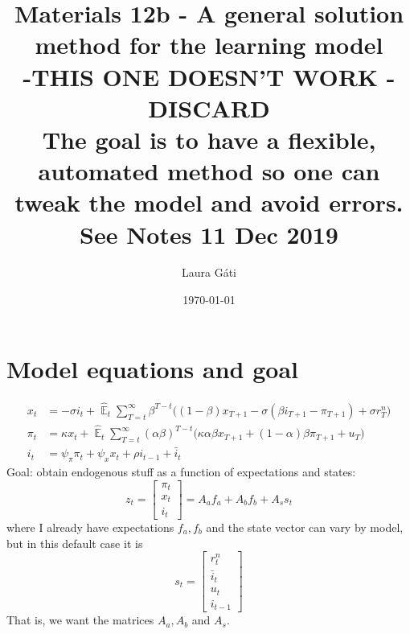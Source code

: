 \documentclass[11pt]{article}
\renewcommand{\[}{\begin{equation}}
\renewcommand{\]}{\end{equation}}
\DeclareMathOperator{\E}{\mathbb{E}}
\begin{document}
\linespread{1.0}

\title{Materials 12b - A general solution method for the learning model \\
-THIS ONE DOESN'T WORK - DISCARD
\\
\small{The goal is to have a flexible, automated method so one can tweak the model and avoid errors. \\See Notes 11 Dec 2019}}
\author{Laura G\'ati} 
\date{\today}
\maketitle




\section{Model equations and goal}
\begin{align}
x_t &=  -\sigma i_t +\hat{\E}_t \sum_{T=t}^{\infty} \beta^{T-t }\big( (1-\beta)x_{T+1} - \sigma(\beta i_{T+1} - \pi_{T+1}) +\sigma r_T^n \big)  \label{prestons18}  \\
\pi_t &= \kappa x_t +\hat{\E}_t \sum_{T=t}^{\infty} (\alpha\beta)^{T-t }\big( \kappa \alpha \beta x_{T+1} + (1-\alpha)\beta \pi_{T+1} + u_T\big) \label{prestons19}  \\
i_t &= \psi_{\pi}\pi_t + \psi_{x} x_t  + \rho i_{t-1} + \bar{i}_t \label{TR}
\end{align}
Goal: obtain endogenous stuff as a function of expectations and states:
\begin{equation}
z_t = \begin{bmatrix} \pi_t \\ x_t \\ i_t \end{bmatrix} = A_a f_{a} + A_b f_{b} + A_s s_t
\end{equation}
where I already have expectations $f_a, f_b$ and the state vector can vary by model, but in this default case it is \begin{equation}
s_t = \begin{bmatrix} r_t^n \\ \bar{i}_t \\ u_t \\ i_{t-1} \end{bmatrix}
\end{equation}
That is,  we want the matrices $A_a, A_b$ and $A_s$.
\end{document}

